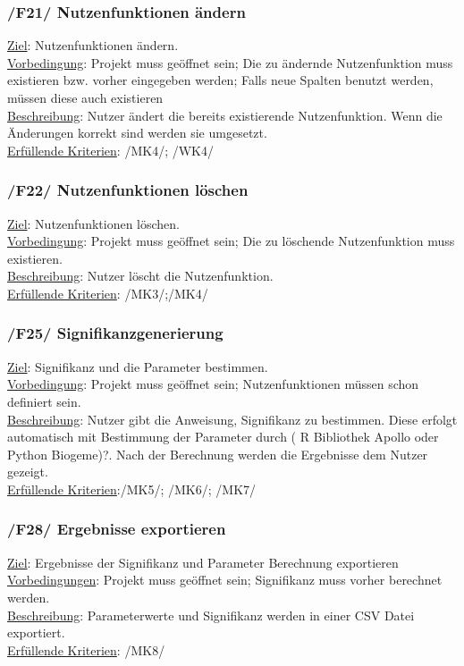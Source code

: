 \documentclass{article}
\begin{document}
\subsubsection*{/F21/ Nutzenfunktionen ändern}
\underline{Ziel}: Nutzenfunktionen ändern.\\
\underline{Vorbedingung}: Projekt muss geöffnet sein; Die zu ändernde Nutzenfunktion muss existieren bzw. vorher eingegeben werden; Falls neue Spalten benutzt werden, müssen diese auch existieren \\
\underline{Beschreibung}: Nutzer ändert die bereits existierende Nutzenfunktion. Wenn die Änderungen korrekt sind werden sie umgesetzt. \\
\underline{Erfüllende Kriterien}: /MK4/; /WK4/
\subsubsection*{/F22/ Nutzenfunktionen löschen}
\underline{Ziel}: Nutzenfunktionen löschen.\\
\underline{Vorbedingung}: Projekt muss geöffnet sein; Die zu löschende Nutzenfunktion muss existieren. \\
\underline{Beschreibung}: Nutzer löscht die Nutzenfunktion. \\
\underline{Erfüllende Kriterien}: /MK3/;/MK4/
\subsubsection*{/F25/ Signifikanzgenerierung}
\underline{Ziel}: Signifikanz und die Parameter bestimmen. \\
\underline{Vorbedingung}: Projekt muss geöffnet sein; Nutzenfunktionen müssen schon definiert sein. \\
\underline{Beschreibung}: Nutzer gibt die Anweisung, Signifikanz zu bestimmen. Diese erfolgt automatisch mit Bestimmung der Parameter durch ( R Bibliothek Apollo oder Python Biogeme)?. Nach der Berechnung werden die Ergebnisse dem Nutzer gezeigt. \\
\underline{Erfüllende Kriterien}:/MK5/; /MK6/; /MK7/ 
\newpage
\subsubsection*{/F28/ Ergebnisse exportieren}
\underline{Ziel}: Ergebnisse der Signifikanz und  Parameter Berechnung exportieren \\
\underline{Vorbedingungen}: Projekt muss geöffnet sein; Signifikanz muss vorher berechnet werden. \\
\underline{Beschreibung}: Parameterwerte und Signifikanz werden in einer CSV Datei exportiert. \\
\underline{Erfüllende Kriterien}: /MK8/
\end{document}
